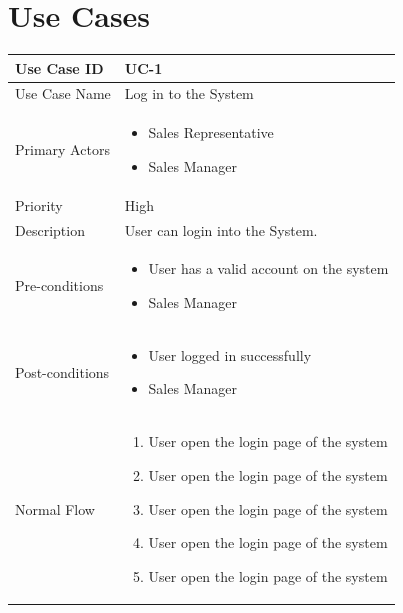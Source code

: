 \documentclass[english,12pt,a4paper]{report}
\begin{document}
	\section{Use Cases}
	\begin{center}
		\begin{tabularx}{\textwidth}{|l|X|}
			\hline
			Use Case ID & UC-1 \\
			\hline
			Use Case Name & Log in to the System \\
			\hline
			Primary Actors & \begin{itemize}
				\item Sales Representative
				\item Sales Manager
			\end{itemize}\\
			\hline
			Priority & High \\
			\hline
			Description & User can login into the System. \\
			\hline
			Pre-conditions &  \begin{itemize}
				\item User has a valid account on the system
				\item Sales Manager
			\end{itemize} \\
			\hline
			Post-conditions & \begin{itemize}
				\item User logged in successfully
				\item Sales Manager
			\end{itemize} \\
			\hline
			Normal Flow & \begin{enumerate}
				\item User open the login page of the system
				\item User open the login page of the system
				\item User open the login page of the system
				\item User open the login page of the system
				\item User open the login page of the system		
			\end{enumerate} \\
			\hline
		\end{tabularx}
	\end{center}
\end{document}
